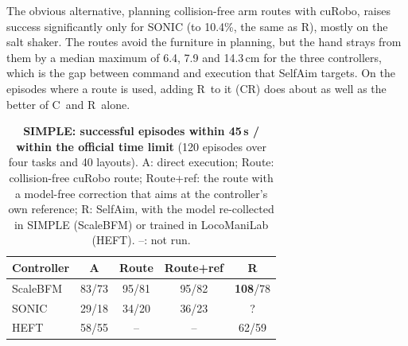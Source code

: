 \documentclass[conference]{IEEEtran}
\newcommand{\Ad}{\textsc{A}}       %
\newcommand{\Rr}{\textsc{R}}       %
\newcommand{\Croute}{\textsc{C}}   %
\newcommand{\CRr}{\textsc{CR}}     %
\begin{document}
The obvious alternative, planning collision-free arm routes with cuRobo, raises success significantly only for SONIC (to 10.4\%, the same as \Rr), mostly on the salt shaker. The routes avoid the furniture in planning, but the hand strays from them by a median maximum of 6.4, 7.9 and 14.3\,cm for the three controllers, which is the gap between command and execution that SelfAim targets. On the episodes where a route is used, adding \Rr\ to it (\CRr) does about as well as the better of \Croute\ and \Rr\ alone.

\begin{table}[t]
\centering
\caption{\textbf{SIMPLE: successful episodes within 45\,s / within the official time limit} (120 episodes over four tasks and 40 layouts). \Ad: direct execution; Route: collision-free cuRobo route; Route+ref: the route with a model-free correction that aims at the controller's own reference; \Rr: SelfAim, with the model re-collected in SIMPLE (ScaleBFM) or trained in LocoManiLab (HEFT). --: not run.}
\label{tab:simple}
\begin{tabular}{lcccc}
\toprule
Controller & \Ad & Route & Route+ref & \Rr \\
\midrule
ScaleBFM & 83/73 & 95/81 & 95/82 & \textbf{108}/78 \\
SONIC    & 29/18 & 34/20 & 36/23 & {\color{red}?} \\
HEFT     & 58/55 & --    & --    & 62/59 \\
\bottomrule
\end{tabular}
\end{table}
\end{document}
